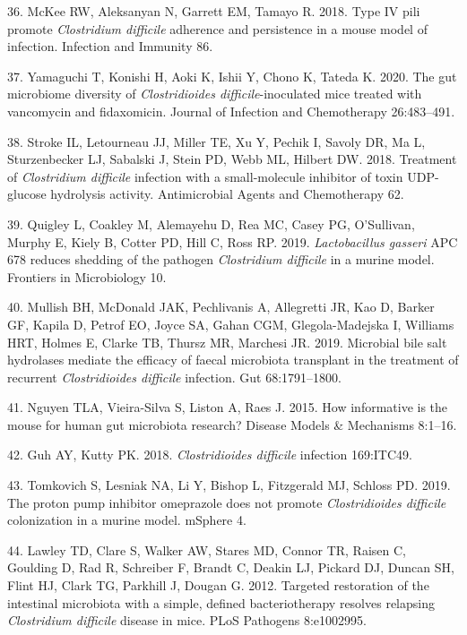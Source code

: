 \documentclass[
  11pt,
]{article}
\begin{document}
\leavevmode\hypertarget{ref-McKee2018}{}%
36. McKee RW, Aleksanyan N, Garrett EM, Tamayo R. 2018. Type IV pili
promote \emph{Clostridium difficile} adherence and persistence in a
mouse model of infection. Infection and Immunity 86.

\leavevmode\hypertarget{ref-Yamaguchi2020}{}%
37. Yamaguchi T, Konishi H, Aoki K, Ishii Y, Chono K, Tateda K. 2020.
The gut microbiome diversity of \emph{Clostridioides
difficile}-inoculated mice treated with vancomycin and fidaxomicin.
Journal of Infection and Chemotherapy 26:483--491.

\leavevmode\hypertarget{ref-Stroke2018}{}%
38. Stroke IL, Letourneau JJ, Miller TE, Xu Y, Pechik I, Savoly DR, Ma
L, Sturzenbecker LJ, Sabalski J, Stein PD, Webb ML, Hilbert DW. 2018.
Treatment of \emph{Clostridium difficile} infection with a
small-molecule inhibitor of toxin UDP-glucose hydrolysis activity.
Antimicrobial Agents and Chemotherapy 62.

\leavevmode\hypertarget{ref-Quigley2019}{}%
39. Quigley L, Coakley M, Alemayehu D, Rea MC, Casey PG, O'Sullivan,
Murphy E, Kiely B, Cotter PD, Hill C, Ross RP. 2019. \emph{Lactobacillus
gasseri} APC 678 reduces shedding of the pathogen \emph{Clostridium
difficile} in a murine model. Frontiers in Microbiology 10.

\leavevmode\hypertarget{ref-Mullish2019}{}%
40. Mullish BH, McDonald JAK, Pechlivanis A, Allegretti JR, Kao D,
Barker GF, Kapila D, Petrof EO, Joyce SA, Gahan CGM, Glegola-Madejska I,
Williams HRT, Holmes E, Clarke TB, Thursz MR, Marchesi JR. 2019.
Microbial bile salt hydrolases mediate the efficacy of faecal microbiota
transplant in the treatment of recurrent \emph{Clostridioides difficile}
infection. Gut 68:1791--1800.

\leavevmode\hypertarget{ref-Nguyen2015}{}%
41. Nguyen TLA, Vieira-Silva S, Liston A, Raes J. 2015. How informative
is the mouse for human gut microbiota research? Disease Models \&
Mechanisms 8:1--16.

\leavevmode\hypertarget{ref-Guh2018}{}%
42. Guh AY, Kutty PK. 2018. \emph{Clostridioides difficile} infection
169:ITC49.

\leavevmode\hypertarget{ref-Tomkovich2019}{}%
43. Tomkovich S, Lesniak NA, Li Y, Bishop L, Fitzgerald MJ, Schloss PD.
2019. The proton pump inhibitor omeprazole does not promote
\emph{Clostridioides difficile} colonization in a murine model. mSphere
4.

\leavevmode\hypertarget{ref-Lawley2012}{}%
44. Lawley TD, Clare S, Walker AW, Stares MD, Connor TR, Raisen C,
Goulding D, Rad R, Schreiber F, Brandt C, Deakin LJ, Pickard DJ, Duncan
SH, Flint HJ, Clark TG, Parkhill J, Dougan G. 2012. Targeted restoration
of the intestinal microbiota with a simple, defined bacteriotherapy
resolves relapsing \emph{Clostridium difficile} disease in mice. PLoS
Pathogens 8:e1002995.
\end{document}
